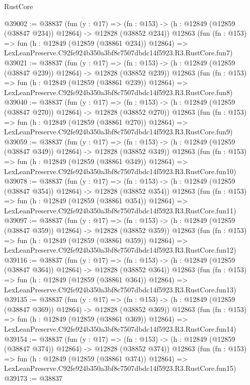 \begin{lexlean}{RustCore}
\begin{coremodule}
@39002 := @38837
    (fun (y : @17) =>
    (fn : @153) -> (h : @12849 (@12859 (@38847 @234)) @12864) -> @12828 (@38852 @234))
    @12863
    (fun (fn : @153) =>
    fun (h : @12849 (@12859 (@38861 @234)) @12864) =>
    LexLeanPreserve.C92fe924b350a3bf8c7507dbdc14f5923.R3.RustCore.fun7)
@39021 := @38837
    (fun (y : @17) =>
    (fn : @153) -> (h : @12849 (@12859 (@38847 @239)) @12864) -> @12828 (@38852 @239))
    @12863
    (fun (fn : @153) =>
    fun (h : @12849 (@12859 (@38861 @239)) @12864) =>
    LexLeanPreserve.C92fe924b350a3bf8c7507dbdc14f5923.R3.RustCore.fun8)
@39040 := @38837
    (fun (y : @17) =>
    (fn : @153) -> (h : @12849 (@12859 (@38847 @270)) @12864) -> @12828 (@38852 @270))
    @12863
    (fun (fn : @153) =>
    fun (h : @12849 (@12859 (@38861 @270)) @12864) =>
    LexLeanPreserve.C92fe924b350a3bf8c7507dbdc14f5923.R3.RustCore.fun9)
@39059 := @38837
    (fun (y : @17) =>
    (fn : @153) -> (h : @12849 (@12859 (@38847 @349)) @12864) -> @12828 (@38852 @349))
    @12863
    (fun (fn : @153) =>
    fun (h : @12849 (@12859 (@38861 @349)) @12864) =>
    LexLeanPreserve.C92fe924b350a3bf8c7507dbdc14f5923.R3.RustCore.fun10)
@39078 := @38837
    (fun (y : @17) =>
    (fn : @153) -> (h : @12849 (@12859 (@38847 @354)) @12864) -> @12828 (@38852 @354))
    @12863
    (fun (fn : @153) =>
    fun (h : @12849 (@12859 (@38861 @354)) @12864) =>
    LexLeanPreserve.C92fe924b350a3bf8c7507dbdc14f5923.R3.RustCore.fun11)
@39097 := @38837
    (fun (y : @17) =>
    (fn : @153) -> (h : @12849 (@12859 (@38847 @359)) @12864) -> @12828 (@38852 @359))
    @12863
    (fun (fn : @153) =>
    fun (h : @12849 (@12859 (@38861 @359)) @12864) =>
    LexLeanPreserve.C92fe924b350a3bf8c7507dbdc14f5923.R3.RustCore.fun12)
@39116 := @38837
    (fun (y : @17) =>
    (fn : @153) -> (h : @12849 (@12859 (@38847 @364)) @12864) -> @12828 (@38852 @364))
    @12863
    (fun (fn : @153) =>
    fun (h : @12849 (@12859 (@38861 @364)) @12864) =>
    LexLeanPreserve.C92fe924b350a3bf8c7507dbdc14f5923.R3.RustCore.fun13)
@39135 := @38837
    (fun (y : @17) =>
    (fn : @153) -> (h : @12849 (@12859 (@38847 @369)) @12864) -> @12828 (@38852 @369))
    @12863
    (fun (fn : @153) =>
    fun (h : @12849 (@12859 (@38861 @369)) @12864) =>
    LexLeanPreserve.C92fe924b350a3bf8c7507dbdc14f5923.R3.RustCore.fun14)
@39154 := @38837
    (fun (y : @17) =>
    (fn : @153) -> (h : @12849 (@12859 (@38847 @374)) @12864) -> @12828 (@38852 @374))
    @12863
    (fun (fn : @153) =>
    fun (h : @12849 (@12859 (@38861 @374)) @12864) =>
    LexLeanPreserve.C92fe924b350a3bf8c7507dbdc14f5923.R3.RustCore.fun15)
@39173 := @38837

\end{coremodule}
\end{lexlean}
